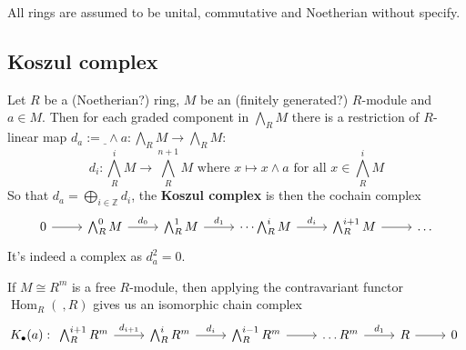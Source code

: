 All rings are assumed to be unital, commutative and Noetherian without specify.

\subsection{Koszul complex}

\begin{definition}



\begin{definition}
	\label{def:minimal_free_resl}
\end{definition}


\begin{proposition}
	\label{prop:loc_resl_min_iff_basis_to_gen}
\end{proposition}


\begin{definition}
	\label{def:koszul_complex}
	Let $R$ be a (Noetherian?) ring, $M$ be an (finitely generated?) $R$-module and $a \in M$.
	Then for each graded component in $\bigwedge_R M$ there is a restriction of $R$-linear map $d_a := \underline{\ } \wedge a: \bigwedge_R M \to \bigwedge_R M$:
	$$d_i: \bigwedge_R^i M \to \bigwedge_R^{n+1}M \text{ where } x \mapsto x \wedge a \text{ for all } x \in \bigwedge_{R}^i M$$
	So that $d_a = \bigoplus_{i \in \mathbb{Z}}d_i$, the \textbf{Koszul complex} is then the cochain complex
	$$\begin{tikzcd}
		0 \arrow[r] & \bigwedge^{0}_R M \arrow[r, "d_{0}"] & \bigwedge^1_R M \arrow[r, "d_1"] & \dots \bigwedge_R^i M\arrow[r, "d_i"] & \bigwedge_R^{i+1} M \arrow[r] & \dots
	\end{tikzcd}$$
	It's indeed a complex as $d_a^2 = 0$.
\end{definition}

\begin{definition}
	\label{def:koszul_complex_dual}
	If $M \cong R^m$ is a free $R$-module, then applying the contravariant functor $\operatorname{Hom}_R(\ , R)$ gives us an isomorphic chain complex 
	$$K_{\bullet}(a) :\begin{tikzcd}
	\bigwedge^{i+1}_R R^m \arrow[r, "d_{i+1}"] & \bigwedge^i_R R^m \arrow[r, "d_i"] & \bigwedge^{i-1}_R R^m \arrow[r] & \dots R^m \arrow[r, "d_1"] & R \arrow[r] & 0
	\end{tikzcd}$$
\end{definition}


\end{definition}
